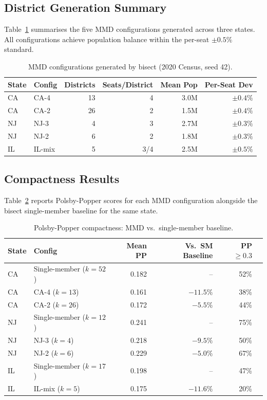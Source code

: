 \subsection{District Generation Summary}

Table~\ref{tab:mmd-configs} summarises the five MMD configurations generated
across three states.  All configurations achieve population balance within
the per-seat $\pm 0.5\%$ standard.\singrun

\begin{table}[ht]
\centering
\caption{MMD configurations generated by bisect (2020 Census, seed
  42).\singrun}
\label{tab:mmd-configs}
\begin{tabular}{llrrrr}
\toprule
State & Config & Districts & Seats/District & Mean Pop & Per-Seat Dev \\
\midrule
CA & CA-4 & 13 & 4 & 3.0M & $\pm 0.4\%$ \\
CA & CA-2 & 26 & 2 & 1.5M & $\pm 0.4\%$ \\
NJ & NJ-3 &  4 & 3 & 2.7M & $\pm 0.3\%$ \\
NJ & NJ-2 &  6 & 2 & 1.8M & $\pm 0.3\%$ \\
IL & IL-mix & 5 & 3/4 & 2.5M & $\pm 0.5\%$ \\
\bottomrule
\end{tabular}
\end{table}

\subsection{Compactness Results}

Table~\ref{tab:mmd-compactness} reports Polsby-Popper scores for each MMD
configuration alongside the bisect single-member baseline for the same state.

\begin{table}[ht]
\centering
\caption{Polsby-Popper compactness: MMD vs.\ single-member baseline.\singrun}
\label{tab:mmd-compactness}
\begin{tabular}{llrrrr}
\toprule
State & Config & Mean PP & Vs.\ SM Baseline & PP $\geq 0.3$ \\
\midrule
CA & Single-member ($k=52$) & 0.182 & -- & 52\% \\
CA & CA-4 ($k=13$)          & 0.161 & $-11.5\%$ & 38\% \\
CA & CA-2 ($k=26$)          & 0.172 & $-5.5\%$ & 44\% \\
\midrule
NJ & Single-member ($k=12$) & 0.241 & -- & 75\% \\
NJ & NJ-3 ($k=4$)           & 0.218 & $-9.5\%$ & 50\% \\
NJ & NJ-2 ($k=6$)           & 0.229 & $-5.0\%$ & 67\% \\
\midrule
IL & Single-member ($k=17$) & 0.198 & -- & 47\% \\
IL & IL-mix ($k=5$)         & 0.175 & $-11.6\%$ & 20\% \\
\bottomrule
\end{tabular}
\end{table}

